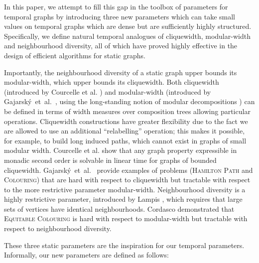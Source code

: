 \documentclass[preprint,12pt]{elsarticle}
\begin{document}
In this paper, we attempt to fill this gap in the toolbox of parameters for temporal graphs by introducing three new parameters which can take small values on temporal graphs which are dense but are sufficiently highly structured.  Specifically, we define natural temporal analogues of cliquewidth, modular-width and neighbourhood diversity, all of which have proved highly effective in the design of efficient algorithms for static graphs.  

Importantly, the neighbourhood diversity of a static graph upper bounds its modular-width, which upper bounds its cliquewidth.  Both cliquewidth (introduced by Courcelle et al. \cite{courcelle_handle-rewriting_1993}) and modular-width (introduced by Gajarsk\'{y}~et~al.~\cite{gajarsky_parameterized_2013}, using the long-standing notion of modular decompositions \cite{gallai_transitiv_1967}) can be defined in terms of width measures over composition trees allowing particular operations.  Cliquewidth constructions have greater flexibility due to the fact we are allowed to use an additional ``relabelling'' operation; this makes it possible, for example, to build long induced paths, which cannot exist in graphs of small modular width.  Courcelle et al. \cite{courcelle_linear_2000} show that any graph property expressible in monadic second order is solvable in linear time for graphs of bounded cliquewidth. Gajarsk\'{y}~et~al.~\cite{gajarsky_parameterized_2013} provide examples of problems (\textsc{Hamilton Path} and \textsc{Colouring}) that are hard with respect to cliquewidth but tractable with respect to the more restrictive parameter modular-width.  Neighbourhood diversity is a highly restrictive parameter, introduced by Lampis \cite{lampis_algorithmic_2012}, which requires that large sets of vertices have identical neighbourhoods.  Cordasco \cite{cordasco_iterated_2020} demonstrated that \textsc{Equitable Colouring} is hard with respect to modular-width but tractable with respect to neighbourhood diversity.


These three static parameters are the inspiration for our temporal parameters. 
 Informally, our new parameters are defined as follows:
 
\end{document}
